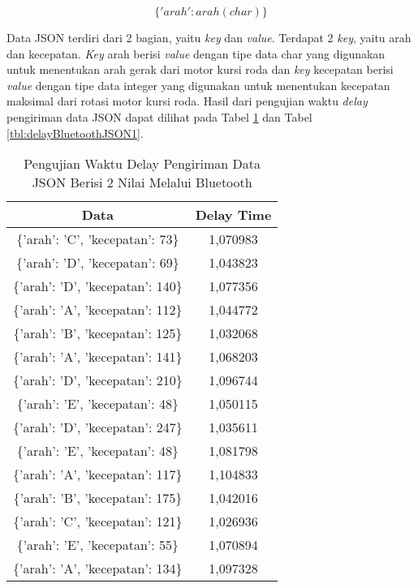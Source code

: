 \begin{equation}
  \label{eq:json-1data}
    \{'arah': arah(char)\}
\end{equation}

Data JSON terdiri dari 2 bagian, yaitu \emph{key} dan \emph{value}. Terdapat 2 \emph{key}, yaitu arah dan kecepatan. \emph{Key} arah berisi \emph{value} dengan tipe data char yang digunakan untuk menentukan arah gerak dari motor kursi roda dan \emph{key} kecepatan berisi \emph{value} dengan tipe data integer yang digunakan untuk menentukan kecepatan maksimal dari rotasi motor kursi roda. Hasil dari pengujian waktu \emph{delay} pengiriman data JSON dapat dilihat pada Tabel \ref{tbl:delayBluetoothJSON2} dan Tabel \ref{tbl:delayBluetoothJSON1}.

\begin{table}[!h]
\centering
  \caption{Pengujian Waktu Delay Pengiriman Data JSON Berisi 2 Nilai Melalui Bluetooth}
  \label{tbl:delayBluetoothJSON2}
  \begin{tabular}{|c|c|}
  \hline
  Data                              & Delay Time  \\ \hline
  \{'arah': 'C', 'kecepatan': 73\}  & 1,070983    \\ \hline
  \{'arah': 'D', 'kecepatan': 69\}  & 1,043823    \\ \hline
  \{'arah': 'D', 'kecepatan': 140\} & 1,077356    \\ \hline
  \{'arah': 'A', 'kecepatan': 112\} & 1,044772    \\ \hline
  \{'arah': 'B', 'kecepatan': 125\} & 1,032068    \\ \hline
  \{'arah': 'A', 'kecepatan': 141\} & 1,068203    \\ \hline
  \{'arah': 'D', 'kecepatan': 210\} & 1,096744    \\ \hline
  \{'arah': 'E', 'kecepatan': 48\}  & 1,050115    \\ \hline
  \{'arah': 'D', 'kecepatan': 247\} & 1,035611    \\ \hline
  \{'arah': 'E', 'kecepatan': 48\}  & 1,081798    \\ \hline
  \{'arah': 'A', 'kecepatan': 117\} & 1,104833    \\ \hline
  \{'arah': 'B', 'kecepatan': 175\} & 1,042016    \\ \hline
  \{'arah': 'C', 'kecepatan': 121\} & 1,026936    \\ \hline
  \{'arah': 'E', 'kecepatan': 55\}  & 1,070894    \\ \hline
  \{'arah': 'A', 'kecepatan': 134\} & 1,097328    \\ \hline

\end{tabular}
\end{table}
